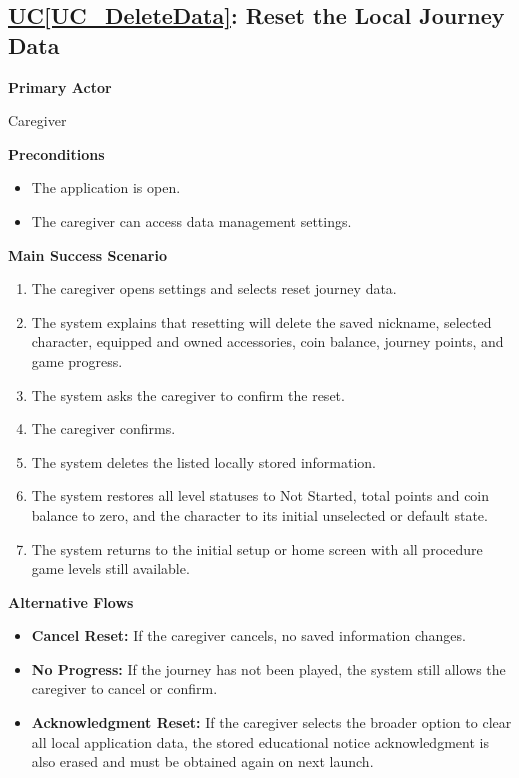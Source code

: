 \documentclass[12pt]{article}
\newcounter{ucnum} %
\newcommand{\ucref}[1]{\hyperref[#1]{UC\ref*{#1}}}
\begin{document}
\label{UC_DeleteData}
\subsection{\ucref{UC_DeleteData}: Reset the Local Journey Data}

\textbf{Primary Actor}

Caregiver

\textbf{Preconditions}
\begin{itemize}
    \item The application is open.
    \item The caregiver can access data management settings.
\end{itemize}

\textbf{Main Success Scenario}
\begin{enumerate}
    \item The caregiver opens settings and selects reset journey data.
    \item The system explains that resetting will delete the saved
    nickname, selected character, equipped and owned accessories,
    coin balance, journey points, and game progress.
    \item The system asks the caregiver to confirm the reset.
    \item The caregiver confirms.
    \item The system deletes the listed locally stored information.
    \item The system restores all level statuses to Not Started,
    total points and coin balance to zero, and the character to
    its initial unselected or default state.
    \item The system returns to the initial setup or home screen
    with all procedure game levels still available.
\end{enumerate}

\textbf{Alternative Flows}
\begin{itemize}
    \item \textbf{Cancel Reset:} If the caregiver cancels, no
    saved information changes.
    \item \textbf{No Progress:} If the journey has not been played,
    the system still allows the caregiver to cancel or confirm.
    \item \textbf{Acknowledgment Reset:} If the caregiver selects
    the broader option to clear all local application data,
    the stored educational notice acknowledgment is also erased
    and must be obtained again on next launch.
\end{itemize}
\end{document}
